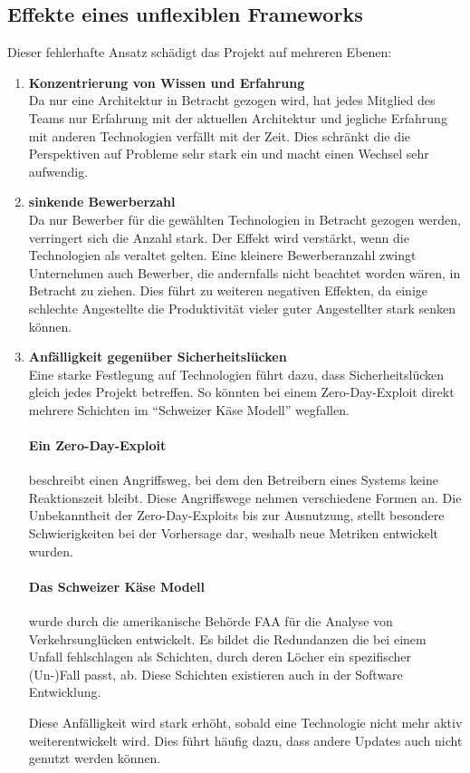 \documentclass[./einleitung.tex]{subfiles}
\begin{document}
\subsection{Effekte eines unflexiblen Frameworks}\label{subsec:effekte-eines-unflexiblen-frameworks}
Dieser fehlerhafte Ansatz schädigt das Projekt auf mehreren Ebenen:
\begin{enumerate}
\item \textbf{Konzentrierung von Wissen und Erfahrung} \\
Da nur eine Architektur in Betracht gezogen wird, hat jedes Mitglied des Teams nur Erfahrung mit der aktuellen Architektur und jegliche Erfahrung mit anderen Technologien verfällt mit der Zeit. Dies schränkt die die Perspektiven auf Probleme sehr stark ein und macht einen Wechsel sehr aufwendig.
\item \textbf{sinkende Bewerberzahl} \\
Da nur Bewerber für die gewählten Technologien in Betracht gezogen werden, verringert sich die Anzahl stark.
Der Effekt wird verstärkt, wenn die Technologien als veraltet gelten.
Eine kleinere Bewerberanzahl zwingt Unternehmen auch Bewerber, die andernfalls nicht beachtet worden wären, in Betracht zu ziehen.
Dies führt zu weiteren negativen Effekten, da einige schlechte Angestellte die Produktivität vieler guter Angestellter stark senken können.
\item \textbf{Anfälligkeit gegenüber Sicherheitslücken} \\
Eine starke Festlegung auf Technologien führt dazu, dass Sicherheitslücken gleich jedes Projekt betreffen.
So könnten bei einem Zero-Day-Exploit direkt mehrere Schichten im ``Schweizer Käse Modell'' wegfallen.
\begin{center}
    \paragraph{Ein Zero-Day-Exploit} beschreibt einen Angriffsweg, bei dem den Betreibern eines Systems keine Reaktionszeit bleibt. \cite{ibmZeroDay}
    Diese Angriffswege nehmen verschiedene Formen an.
    Die Unbekanntheit der Zero-Day-Exploits bis zur Ausnutzung, stellt besondere Schwierigkeiten bei der Vorhersage dar, weshalb neue Metriken entwickelt wurden. \cite{wang2013k}
\end{center}
\begin{center}
    \paragraph{Das Schweizer Käse Modell} wurde durch die amerikanische Behörde FAA für die Analyse von Verkehrsunglücken entwickelt.
    Es bildet die Redundanzen die bei einem Unfall fehlschlagen als Schichten, durch deren Löcher ein spezifischer (Un-)Fall passt, ab.
    Diese Schichten existieren auch in der Software Entwicklung.\cite{bergeon2009swiss} %
\end{center}
Diese Anfälligkeit wird stark erhöht, sobald eine Technologie nicht mehr aktiv weiterentwickelt wird.
Dies führt häufig dazu, dass andere Updates auch nicht genutzt werden können.
\end{enumerate}
\end{document}
